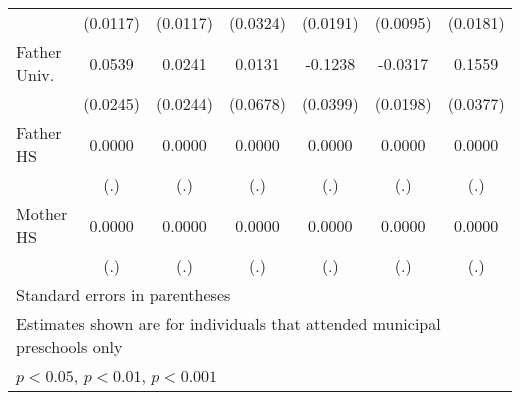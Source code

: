 \begin{table}[htbp]
\begin{tabular}{l*{6}{c}}
            &    (0.0117)         &    (0.0117)         &    (0.0324)         &    (0.0191)         &    (0.0095)         &    (0.0181)         \\
\addlinespace
Father Univ.&      0.0539\sym{*}  &      0.0241         &      0.0131         &     -0.1238\sym{**} &     -0.0317         &      0.1559\sym{***}\\
            &    (0.0245)         &    (0.0244)         &    (0.0678)         &    (0.0399)         &    (0.0198)         &    (0.0377)         \\
\addlinespace
Father HS   &      0.0000         &      0.0000         &      0.0000         &      0.0000         &      0.0000         &      0.0000         \\
            &         (.)         &         (.)         &         (.)         &         (.)         &         (.)         &         (.)         \\
\addlinespace
Mother HS   &      0.0000         &      0.0000         &      0.0000         &      0.0000         &      0.0000         &      0.0000         \\
            &         (.)         &         (.)         &         (.)         &         (.)         &         (.)         &         (.)         \\
\bottomrule
\multicolumn{7}{l}{\footnotesize Standard errors in parentheses}\\
\multicolumn{7}{l}{\footnotesize Estimates shown are for individuals that attended municipal preschools only}\\
\multicolumn{7}{l}{\footnotesize \sym{*} \(p<0.05\), \sym{**} \(p<0.01\), \sym{***} \(p<0.001\)}\\
\end{tabular}
\end{table}
